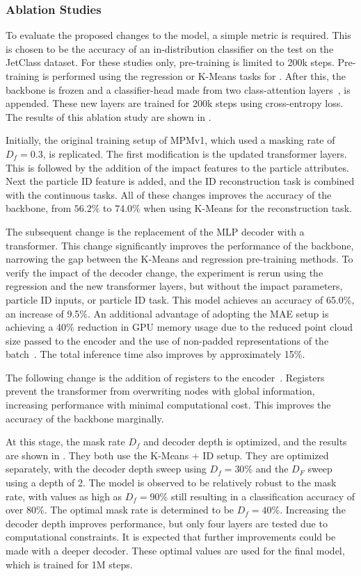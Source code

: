 \subsubsection{Ablation Studies}

To evaluate the proposed changes to the model, a simple metric is required.
This is chosen to be the accuracy of an in-distribution classifier on the test on the JetClass dataset.
For these studies only, pre-training is limited to 200k steps.
Pre-training is performed using the regression or K-Means tasks for \xc.
After this, the backbone is frozen and a classifier-head made from two class-attention layers~\cite{GoingDeeper}, is appended.
These new layers are trained for 200k steps using cross-entropy loss.
The results of this ablation study are shown in .

Initially, the original training setup of MPMv1, which used a masking rate of $D_f=0.3$, is replicated.
The first modification is the updated transformer layers.
This is followed by the addition of the impact features to the particle attributes.
Next the particle ID feature is added, and the ID reconstruction task is combined with the continuous tasks.
All of these changes improves the accuracy of the backbone, from $56.2\%$ to $74.0\%$ when using K-Means for the reconstruction task.

The subsequent change is the replacement of the MLP decoder with a transformer.
This change significantly improves the performance of the backbone, narrowing the gap between the K-Means and regression pre-training methods.
To verify the impact of the decoder change, the experiment is rerun using the regression and the new transformer layers, but without the impact parameters, particle ID inputs, or particle ID task.
This model achieves an accuracy of 65.0\%, an increase of 9.5\%.
An additional advantage of adopting the MAE setup is achieving a 40\% reduction in GPU memory usage due to the reduced point cloud size passed to the encoder and the use of non-padded representations of the batch~\cite{FlashAttentionFastMemoryEfficient}.
The total inference time also improves by approximately 15\%.

The following change is the addition of registers to the encoder~\cite{VisionTransformersNeed}.
Registers prevent the transformer from overwriting nodes with global information, increasing performance with minimal computational cost.
This improves the accuracy of the backbone marginally.

At this stage, the mask rate $D_f$ and decoder depth is optimized, and the results are shown in .
They both use the K-Means + ID setup.
They are optimized separately, with the decoder depth sweep using $D_f=30\%$ and the $D_F$ sweep using a depth of 2.
The model is observed to be relatively robust to the mask rate, with values as high as $D_f=90\%$ still resulting in a classification accuracy of over 80\%.
The optimal mask rate is determined to be $D_f=40\%$.
Increasing the decoder depth improves performance, but only four layers are tested due to computational constraints.
It is expected that further improvements could be made with a deeper decoder.
These optimal values are used for the final model, which is trained for 1M steps.


